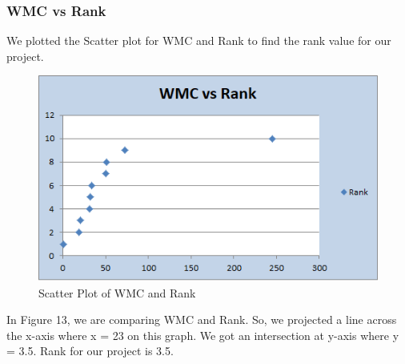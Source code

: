 \documentclass[a4paper, 11pt]{article}
\begin{document}
\subsubsection{WMC vs Rank}
We plotted the Scatter plot for WMC and Rank to find the rank value for our project.
\begin{figure}[!hbt]
		\begin{center}
		\includegraphics[width=\columnwidth]{Scatter2.png}
		\caption{Scatter Plot of WMC and Rank}
		\label{fig:figure}
		\end{center}
	\end{figure}
In Figure 13, we are comparing WMC and Rank. So, we projected a line across the x-axis where x = 23 on this graph. We got an intersection at y-axis where y = 3.5. Rank for our project is 3.5.
\end{document}
